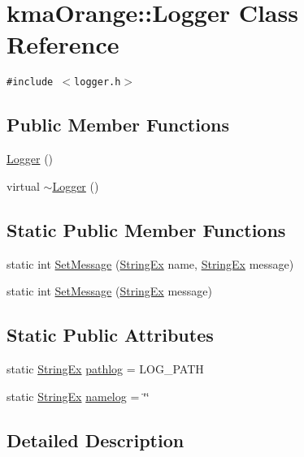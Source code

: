 \hypertarget{classkmaOrange_1_1Logger}{
\section{kmaOrange::Logger Class Reference}
\label{classkmaOrange_1_1Logger}
}
{\tt \#include $<$logger.h$>$}

\subsection*{Public Member Functions}
\begin{CompactItemize}
\item 
\hyperlink{classkmaOrange_1_1Logger_bc41bfb031d896170c7675fa96a6b30c}{Logger} ()
\item 
virtual \hyperlink{classkmaOrange_1_1Logger_cb668a9e186a25fbaad2e4af6d1ed00a}{$\sim$Logger} ()
\end{CompactItemize}
\subsection*{Static Public Member Functions}
\begin{CompactItemize}
\item 
static int \hyperlink{classkmaOrange_1_1Logger_c80cafebd5d6501fb52a052ebe355293}{SetMessage} (\hyperlink{classStringEx}{StringEx} name, \hyperlink{classStringEx}{StringEx} message)
\item 
static int \hyperlink{classkmaOrange_1_1Logger_0d95f7da1542407908257b94c5f37475}{SetMessage} (\hyperlink{classStringEx}{StringEx} message)
\end{CompactItemize}
\subsection*{Static Public Attributes}
\begin{CompactItemize}
\item 
static \hyperlink{classStringEx}{StringEx} \hyperlink{classkmaOrange_1_1Logger_4b0f42b5917a47a7c6cc171b9b74219a}{pathlog} = LOG\_\-PATH
\item 
static \hyperlink{classStringEx}{StringEx} \hyperlink{classkmaOrange_1_1Logger_80b6d6d721c122c8e5727eed64a9f0d6}{namelog} = \char`\"{}\char`\"{}
\end{CompactItemize}


\subsection{Detailed Description}


